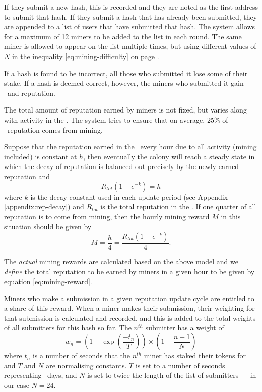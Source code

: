 If they submit a new hash, this is recorded and they are noted as the first address to submit that hash. If they submit a hash that has already been submitted, they are appended to a list of users that have submitted that hash. The system allows for a maximum of 12 miners to be added to the list in each round. The same miner is allowed to appear on the list multiple times, but using different values of $N$ in the inequality \eqref{eq:mining-difficulty} on page \pageref{eq:mining-difficulty}.

If a hash is found to be incorrect, all those who submitted it lose some of their stake. If a hash is deemed correct, however, the miners who submitted it gain \rcts\ and reputation.

The total amount of reputation earned by miners is not fixed, but varies along with activity in the \rc. The system tries to ensure that on average, 25\% of \rc\ reputation comes from mining. %

Suppose that the reputation earned in the \rc\ every hour due to all activity (mining included) is constant at $h$, then eventually the colony will reach a steady state in which the decay of reputation is balanced out precisely by the newly earned reputation and
\begin{equation}
 R_{tot} \left( 1 - e^{-k} \right) = h
\end{equation}
\noindent where $k$ is the decay constant used in each update period (see Appendix \ref{appendix:rep-decay}) and $R_{tot}$ is the total reputation in the \rc. If one quarter of all reputation is to come from mining, then the hourly mining reward $M$ in this situation should be given by
\begin{equation}\label{eq:mining-reward}
 M = \frac{h}{4} = \frac{R_{tot} \left( 1 - e^{-k} \right)}{4}.
\end{equation}

The \emph{actual} mining rewards are calculated based on the above model and we \emph{define} the total reputation to be earned by miners in a given hour to be given by equation \eqref{eq:mining-reward}.

Miners who make a submission in a given reputation update cycle are entitled to a share of this reward. When a miner makes their submission, their weighting for that submission is calculated and recorded, and this is added to the total weights of all submitters for this hash so far. The $n^{th}$ submitter has a weight of
\begin{equation}\label{eq:miner-weighting}
 w_n = \left(1 - \exp\left(\frac{-t_n}{T}\right)\right) \times \left( 1 - \frac{n-1}{N} \right)
\end{equation}
where $t_n$ is a number of seconds that the $n^{th}$ miner has staked their tokens for and $T$ and $N$ are normalising constants. $T$ is set to a number of seconds representing \miningstakeduration\ days, and $N$ is set to twice the length of the list of submitters --- in our case $N=24$.

